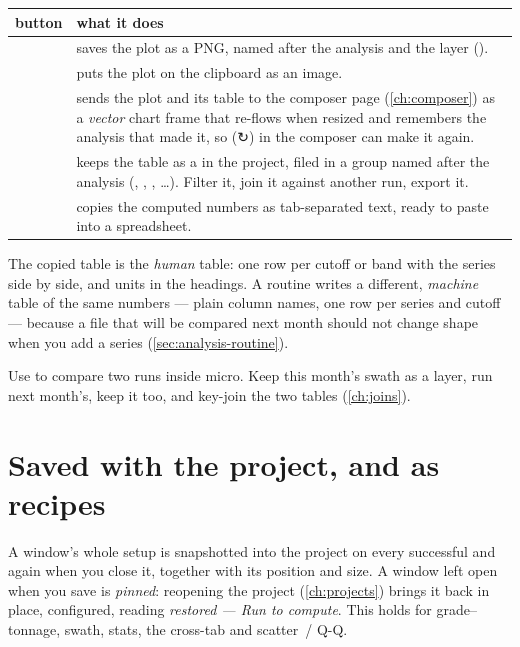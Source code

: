 \medskip
\begin{tabularx}{\linewidth}{@{}lL@{}}\toprule
button & what it does \\ \midrule
{} & saves the plot as a PNG, named after the analysis and the layer (). \\
 & puts the plot on the clipboard as an image. \\
 & sends the plot and its table to the composer page (\cref{ch:composer}) as a \emph{vector} chart frame that re-flows when resized and remembers the analysis that made it, so  (↻) in the composer can make it again. \\
 & keeps the table as a  in the project, filed in a group named after the analysis (, , , …). Filter it, join it against another run, export it. \\
 & copies the computed numbers as tab-separated text, ready to paste into a spreadsheet. \\ \bottomrule
\end{tabularx}
\medskip

The copied table is the \emph{human} table: one row per cutoff or band with the series side by side, and units in the headings. A routine writes a different, \emph{machine} table of the same numbers — plain column names, one row per series and cutoff — because a file that will be compared next month should not change shape when you add a series (\cref{sec:analysis-routine}).

\begin{tip}
Use  to compare two runs inside micro. Keep this month's swath as a layer, run next month's, keep it too, and key-join the two tables (\cref{ch:joins}).
\end{tip}

\section{Saved with the project, and as recipes}\label{sec:analysis-saved}
A window's whole setup is snapshotted into the project on every successful  and again when you close it, together with its position and size. A window left open when you save is \emph{pinned}: reopening the project (\cref{ch:projects}) brings it back in place, configured, reading \emph{restored — Run to compute}. This holds for grade–tonnage, swath, stats, the cross-tab and scatter~/ Q-Q.

